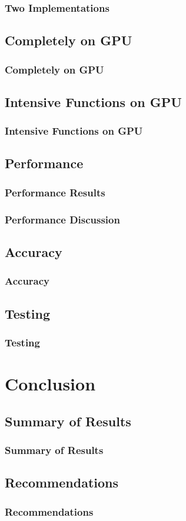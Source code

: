 \documentclass{beamer}
\begin{document}
\begin{frame}
\frametitle{Two Implementations}
\end{frame}

\subsection{Completely on GPU}
\begin{frame}
\frametitle{Completely on GPU}
\end{frame}

\subsection{Intensive Functions on GPU}
\begin{frame}
\frametitle{Intensive Functions on GPU}
\end{frame}

\subsection{Performance}
\begin{frame}
\frametitle{Performance Results}
\end{frame}

\begin{frame}
\frametitle{Performance Discussion}
\end{frame}

\subsection{Accuracy}
\begin{frame}
\frametitle{Accuracy}
\end{frame}

\subsection{Testing}
\begin{frame}
\frametitle{Testing}
\end{frame}

\section{Conclusion}
\subsection{Summary of Results}
\begin{frame}
\frametitle{Summary of Results}
\end{frame}

\subsection{Recommendations}
\begin{frame}
\frametitle{Recommendations}
\end{frame}
\end{document}
